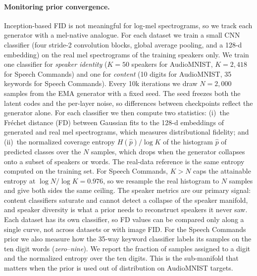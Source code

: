 
\paragraph{Monitoring prior convergence.}
Inception-based FID is not meaningful for log-mel spectrograms, so we track each
generator with a mel-native analogue. For each dataset we train a small CNN
classifier (four stride-2 convolution blocks, global average pooling, and a 128-d
embedding) on the real mel spectrograms of the training speakers only. We train one
classifier for \emph{speaker identity} ($K{=}50$ speakers for AudioMNIST,
$K{=}2{,}418$ for Speech Commands) and one for \emph{content} (10 digits for
AudioMNIST, 35 keywords for Speech Commands). Every 10k iterations we draw
$N{=}2{,}000$ samples from the EMA generator with a fixed seed. The seed freezes both
the latent codes and the per-layer noise, so differences between checkpoints reflect
the generator alone. For each classifier we then compute two statistics:
(i)~the Fr\'echet distance (FD) between Gaussian fits to the 128-d embeddings of
generated and real mel spectrograms, which measures distributional fidelity; and
(ii)~the normalized coverage entropy $H(\hat{p})/\log K$ of the histogram $\hat{p}$ of
predicted classes over the $N$ samples, which drops when the generator collapses onto
a subset of speakers or words. The real-data reference is the same entropy computed on
the training set. For Speech Commands, $K > N$ caps the attainable entropy at
$\log N/\log K = 0.976$, so we resample the real histogram to $N$ samples and give
both sides the same ceiling. The speaker metrics are our primary signal: content
classifiers saturate and cannot detect a collapse of the speaker manifold, and speaker
diversity is what a prior needs to reconstruct speakers it never saw. Each dataset
has its own classifier, so FD values can be compared only along a single curve, not
across datasets or with image FID. For the Speech Commands prior we also measure how
the 35-way keyword classifier labels its samples on the ten digit words
(\emph{zero}--\emph{nine}). We report the fraction of samples assigned to a digit and
the normalized entropy over the ten digits. This is the sub-manifold that matters when
the prior is used out of distribution on AudioMNIST targets.

